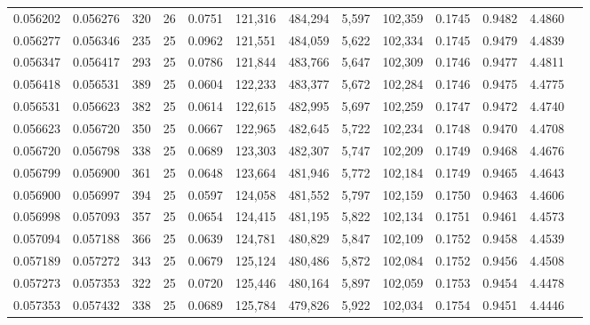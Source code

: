 \begin{tabular}{rrrrrrrrrrrrr}
0.056202 & 0.056276 &   320 &  26 &                                     0.0751 & 121,316 & 484,294 &   5,597 & 102,359 & 0.1745 & 0.9482 & 4.4860 \\
0.056277 & 0.056346 &   235 &  25 &                                     0.0962 & 121,551 & 484,059 &   5,622 & 102,334 & 0.1745 & 0.9479 & 4.4839 \\
0.056347 & 0.056417 &   293 &  25 &                                     0.0786 & 121,844 & 483,766 &   5,647 & 102,309 & 0.1746 & 0.9477 & 4.4811 \\
0.056418 & 0.056531 &   389 &  25 &                                     0.0604 & 122,233 & 483,377 &   5,672 & 102,284 & 0.1746 & 0.9475 & 4.4775 \\
0.056531 & 0.056623 &   382 &  25 &                                     0.0614 & 122,615 & 482,995 &   5,697 & 102,259 & 0.1747 & 0.9472 & 4.4740 \\
0.056623 & 0.056720 &   350 &  25 &                                     0.0667 & 122,965 & 482,645 &   5,722 & 102,234 & 0.1748 & 0.9470 & 4.4708 \\
0.056720 & 0.056798 &   338 &  25 &                                     0.0689 & 123,303 & 482,307 &   5,747 & 102,209 & 0.1749 & 0.9468 & 4.4676 \\
0.056799 & 0.056900 &   361 &  25 &                                     0.0648 & 123,664 & 481,946 &   5,772 & 102,184 & 0.1749 & 0.9465 & 4.4643 \\
0.056900 & 0.056997 &   394 &  25 &                                     0.0597 & 124,058 & 481,552 &   5,797 & 102,159 & 0.1750 & 0.9463 & 4.4606 \\
0.056998 & 0.057093 &   357 &  25 &                                     0.0654 & 124,415 & 481,195 &   5,822 & 102,134 & 0.1751 & 0.9461 & 4.4573 \\
0.057094 & 0.057188 &   366 &  25 &                                     0.0639 & 124,781 & 480,829 &   5,847 & 102,109 & 0.1752 & 0.9458 & 4.4539 \\
0.057189 & 0.057272 &   343 &  25 &                                     0.0679 & 125,124 & 480,486 &   5,872 & 102,084 & 0.1752 & 0.9456 & 4.4508 \\
0.057273 & 0.057353 &   322 &  25 &                                     0.0720 & 125,446 & 480,164 &   5,897 & 102,059 & 0.1753 & 0.9454 & 4.4478 \\
0.057353 & 0.057432 &   338 &  25 &                                     0.0689 & 125,784 & 479,826 &   5,922 & 102,034 & 0.1754 & 0.9451 & 4.4446 \\

\end{tabular}

